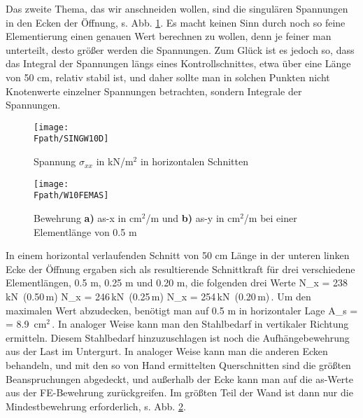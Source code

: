 {Das zweite Thema, das wir anschneiden wollen, sind die singul\"{a}ren Spannungen in den Ecken der \"{O}ffnung, s. Abb. \ref{SingW10}. Es macht keinen Sinn durch noch so feine Elementierung einen genauen Wert berechnen zu wollen, denn je feiner man unterteilt, desto gr\"{o}{\ss}er werden die Spannungen. Zum Gl\"{u}ck ist es jedoch so, dass das Integral der Spannungen l\"{a}ngs eines Kontrollschnittes, etwa \"{u}ber eine L\"{a}nge von 50 cm, relativ stabil ist, und daher sollte man in solchen Punkten nicht Knotenwerte einzelner Spannungen betrachten, sondern Integrale der Spannungen.
\begin{figure}[tbp] \centering
\if {} \sidecaption \fi
\texttt{[image: \\Fpath/SINGW10D]}
\caption{Spannung $\sigma_{xx}$ in kN/m$^2$ in horizontalen Schnit\-ten} \label{SingW10}
\end{figure}%

\begin{figure}[tbp] \centering
\if {} \sidecaption \fi
\texttt{[image: \\Fpath/W10FEMAS]}
\caption{Bewehrung {\bf a)} as-x in cm$^2$/m und {\bf b)} as-y in cm$^2$/m bei einer
Elementl\"{a}nge von 0.5 m} \label{W10FEMAS}
\end{figure}%

In einem horizontal verlaufenden Schnitt von 50 cm L\"{a}nge in der unteren linken Ecke der
\"{O}ffnung ergaben sich als resultierende Schnittkraft f\"{u}r drei verschiedene Elementl\"{a}ngen,
0.5 m, 0.25 m und 0.20 m, die folgenden drei Werte
\bfoo
N_{x} = 238\,\mbox{kN}\,\,\,(0.50\,\mbox{m}) \qquad N_{x} = 246\,\mbox{kN}\,\,\,(0.25\,\mbox{m})\qquad
N_{x} = 254\,\mbox{kN}\,\,\,(0.20\,\mbox{m})\,.
\efoo
Um den maximalen Wert abzudecken, ben\"{o}tigt man auf 0.5 m in horizontaler Lage
\bfoo
A_s =  = 8.9 \,\mbox{cm$^2$}\,.
\efoo
In analoger Weise kann man den Stahlbedarf in vertikaler Richtung ermitteln. Diesem Stahlbedarf hinzuzuschlagen ist noch die Aufh\"{a}ngebewehrung aus der Last im Untergurt. In analoger Weise kann man die anderen Ecken behandeln, und mit den so von Hand ermittelten Querschnitten sind die gr\"{o}{\ss}ten Beanspruchungen abgedeckt, und au{\ss}erhalb der Ecke kann man auf die as-Werte aus der FE-Bewehrung zur\"{u}ckgreifen. Im gr\"{o}{\ss}ten Teil der Wand ist dann nur die Mindestbewehrung erforderlich, s. Abb. \ref{W10FEMAS}.

}
